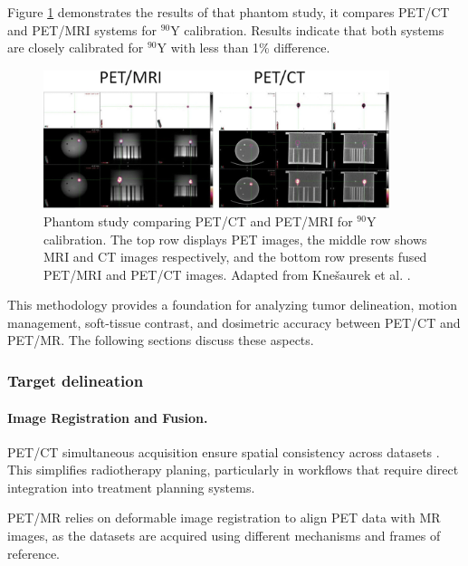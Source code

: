 \documentclass[11pt]{article} %
\begin{document}
\begin{multicols}{2}

Figure \ref{fig:phantom_petct_petmri} demonstrates the results of that phantom study, it compares PET/CT and PET/MRI systems for $^{90}\text{Y}$ calibration. Results indicate that both systems are closely calibrated for \(^{90}\text{Y}\) with less than 1\% difference.

\begin{figure}[ht]
\centering
\includegraphics[width=0.9\textwidth]{assets/PETCT_vs_PETMRI_Phantom.png} %
\caption{Phantom study comparing PET/CT and PET/MRI for \(^{90}\text{Y}\) calibration. The top row displays PET images, the middle row shows MRI and CT images respectively, and the bottom row presents fused PET/MRI and PET/CT images.  Adapted from Knešaurek et al. \cite{knesaurek2018}.}
\label{fig:phantom_petct_petmri}
\end{figure}

This methodology provides a foundation for analyzing tumor delineation, motion management, soft-tissue contrast, and dosimetric accuracy between PET/CT and PET/MR. The following sections discuss these aspects.

\subsubsection{Target delineation}

\paragraph{Image Registration and Fusion.} 

PET/CT simultaneous acquisition ensure spatial consistency across datasets \cite{TG132}. This simplifies radiotherapy planing, particularly in workflows that require direct integration into treatment planning systems. 

PET/MR relies on deformable image registration to align PET data with MR images, as the datasets are acquired using different mechanisms and frames of reference. %


\end{multicols}
\end{document}
